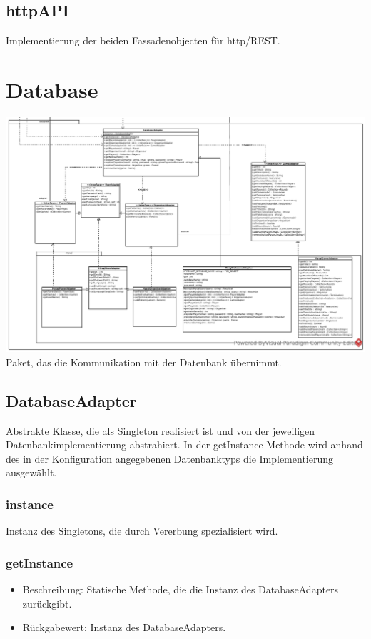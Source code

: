 \documentclass[a4paper]{scrreprt}
\begin{document}
	\subsection{httpAPI}
	Implementierung der beiden Fassadenobjecten für http/REST.

	\section{Database}
	\includegraphics[width=\textwidth]{img/package/database.pdf}
	Paket, das die Kommunikation mit der Datenbank übernimmt.

	\subsection{DatabaseAdapter}
	Abstrakte Klasse, die als Singleton realisiert ist und von der jeweiligen Datenbankimplementierung abstrahiert.
	In der getInstance Methode wird anhand des in der Konfiguration angegebenen Datenbanktyps die Implementierung ausgewählt.

	\subsubsection{instance}
	Instanz des Singletons, die durch Vererbung spezialisiert wird.

	\subsubsection{getInstance}
	\begin{itemize}
		\item Beschreibung: Statische Methode, die die Instanz des DatabaseAdapters zurückgibt.
		\item Rückgabewert: Instanz des DatabaseAdapters.
	\end{itemize}
\end{document}
